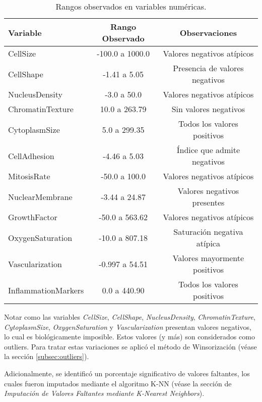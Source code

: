 \begin{table}[H]
\centering
\begin{tabular}{lcc}
\toprule
\textbf{Variable} & \textbf{Rango Observado} & \textbf{Observaciones} \\
\midrule
CellSize         & -100.0 a 1000.0         & Valores negativos atípicos \\
CellShape        & -1.41 a 5.05            & Presencia de valores negativos \\
NucleusDensity   & -3.0 a 50.0             & Valores negativos atípicos \\
ChromatinTexture & 10.0 a 263.79           & Sin valores negativos \\
CytoplasmSize    & 5.0 a 299.35            & Todos los valores positivos \\
CellAdhesion     & -4.46 a 5.03            & Índice que admite negativos \\
MitosisRate      & -50.0 a 100.0           & Valores negativos atípicos \\
NuclearMembrane  & -3.44 a 24.87           & Valores negativos presentes \\
GrowthFactor     & -50.0 a 563.62          & Valores negativos atípicos \\
OxygenSaturation & -10.0 a 807.18          & Saturación negativa atípica \\
Vascularization  & -0.997 a 54.51          & Valores mayormente positivos \\
InflammationMarkers & 0.0 a 440.90         & Todos los valores positivos \\
\bottomrule
\end{tabular}
\caption{Rangos observados en variables numéricas.}
\label{tab:rangos}
\end{table}



Notar como las variables \textit{CellSize}, \textit{CellShape}, \textit{NucleusDensity}, \textit{ChromatinTexture}, \textit{CytoplasmSize}, \textit{OxygenSaturation} y \textit{Vascularization} presentan valores negativos, lo cual es biológicamente imposible. Estos valores (y más) son considerados como outliers. Para tratar estas variaciones se aplicó el método de Winsorización (véase la sección \ref{subsec:outliers}).

Adicionalmente, se identificó un porcentaje significativo de valores faltantes, los cuales fueron imputados mediante el algoritmo K-NN (véase la sección de \textit{Imputación de Valores Faltantes mediante K-Nearest Neighbors}).



